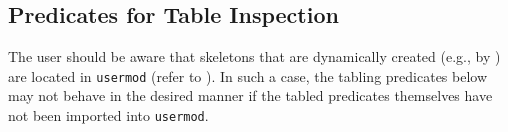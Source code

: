\begin{description}

%
%


%

\end{description}


\subsection{Predicates for Table Inspection} \label{sec:table-inspection}
\label{sec:TablePred:Inspection}

The user should be aware that skeletons that are dynamically created
(e.g., by ) are located in {\tt usermod} (refer to
).  In such a case, the tabling predicates below may
not behave in the desired manner if the tabled predicates themselves
have not been imported into {\tt usermod}.

